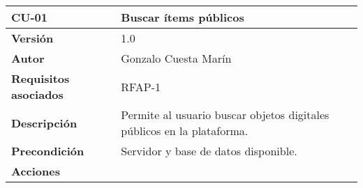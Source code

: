 \begin{longtable}[]{@{}ll@{}}
\toprule
\begin{minipage}[b]{0.21\columnwidth}\raggedright
\textbf{CU-01}\strut
\end{minipage} & \begin{minipage}[b]{0.73\columnwidth}\raggedright
\textbf{Buscar ítems públicos}\strut
\end{minipage}\tabularnewline
\midrule
\endhead
\begin{minipage}[t]{0.21\columnwidth}\raggedright
\textbf{Versión}\strut
\end{minipage} & \begin{minipage}[t]{0.73\columnwidth}\raggedright
1.0\strut
\end{minipage}\tabularnewline
\begin{minipage}[t]{0.21\columnwidth}\raggedright
\textbf{Autor}\strut
\end{minipage} & \begin{minipage}[t]{0.73\columnwidth}\raggedright
Gonzalo Cuesta Marín\strut
\end{minipage}\tabularnewline
\begin{minipage}[t]{0.21\columnwidth}\raggedright
\textbf{Requisitos asociados}\strut
\end{minipage} & \begin{minipage}[t]{0.73\columnwidth}\raggedright
RFAP-1\strut
\end{minipage}\tabularnewline
\begin{minipage}[t]{0.21\columnwidth}\raggedright
\textbf{Descripción}\strut
\end{minipage} & \begin{minipage}[t]{0.73\columnwidth}\raggedright
Permite al usuario buscar objetos digitales públicos en la
plataforma.\strut
\end{minipage}\tabularnewline
\begin{minipage}[t]{0.21\columnwidth}\raggedright
\textbf{Precondición}\strut
\end{minipage} & \begin{minipage}[t]{0.73\columnwidth}\raggedright
Servidor y base de datos disponible.\strut
\end{minipage}\tabularnewline
\begin{minipage}[t]{0.21\columnwidth}\raggedright
\textbf{Acciones}\strut
\end{minipage} & \begin{minipage}[t]{0.73\columnwidth}\raggedright
\begin{enumerate}

\end{enumerate}
\end{minipage}
\end{longtable}
